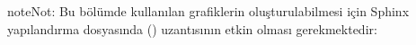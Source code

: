 \documentclass[a4paper,10pt,turkish]{sphinxmanual}
\begin{document}
\begin{sphinxadmonition}{note}{Not:}
\sphinxAtStartPar
Bu bölümde kullanılan grafiklerin oluşturulabilmesi için Sphinx yapılandırma dosyasında
()  uzantısının etkin olması gerekmektedir:

\begin{sphinxVerbatim}[commandchars=\\\{\}]
  \PYG{p}{[}
\PYG{p}{]}
\end{sphinxVerbatim}
\end{sphinxadmonition}



\renewcommand{\indexname}{Dizin}
\printindex
\end{document}
